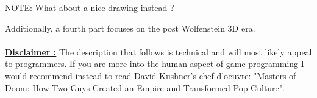 NOTE: What about a nice drawing instead ?

Additionally, a fourth part focuses on the post Wolfenstein 3D era.\\
\\
 \textbf{\underline{Disclaimer :}} The description that follows is technical and will most likely appeal to programmers. If you are more into the human aspect of game programming I would recommend instead to read David Kushner's chef d'oeuvre: "Masters of Doom: How Two Guys Created an Empire and Transformed Pop Culture".\\
 \\
